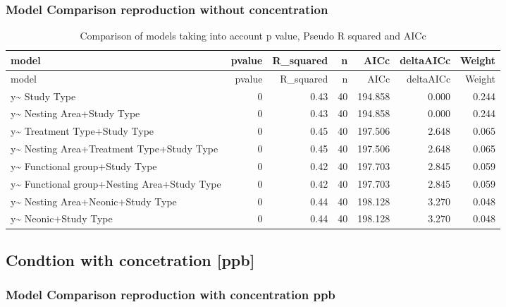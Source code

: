 \documentclass[]{elsarticle} %
\begin{document}
\subsubsection{Model Comparison reproduction without
concentration}\label{model-comparison-reproduction-without-concentration-1}

\begin{longtable}[c]{@{}lrrrrrr@{}}
\caption{Comparison of models taking into account p value, Pseudo R
squared and AICc}\tabularnewline
\toprule
model & pvalue & R\_squared & n & AICc & deltaAICc &
Weight\tabularnewline
\midrule
\endfirsthead
\toprule
model & pvalue & R\_squared & n & AICc & deltaAICc &
Weight\tabularnewline
\midrule
\endhead
y\textasciitilde{} Study Type & 0 & 0.43 & 40 & 194.858 & 0.000 &
0.244\tabularnewline
y\textasciitilde{} Nesting Area+Study Type & 0 & 0.43 & 40 & 194.858 &
0.000 & 0.244\tabularnewline
y\textasciitilde{} Treatment Type+Study Type & 0 & 0.45 & 40 & 197.506 &
2.648 & 0.065\tabularnewline
y\textasciitilde{} Nesting Area+Treatment Type+Study Type & 0 & 0.45 &
40 & 197.506 & 2.648 & 0.065\tabularnewline
y\textasciitilde{} Functional group+Study Type & 0 & 0.42 & 40 & 197.703
& 2.845 & 0.059\tabularnewline
y\textasciitilde{} Functional group+Nesting Area+Study Type & 0 & 0.42 &
40 & 197.703 & 2.845 & 0.059\tabularnewline
y\textasciitilde{} Nesting Area+Neonic+Study Type & 0 & 0.44 & 40 &
198.128 & 3.270 & 0.048\tabularnewline
y\textasciitilde{} Neonic+Study Type & 0 & 0.44 & 40 & 198.128 & 3.270 &
0.048\tabularnewline
\bottomrule
\end{longtable}

\subsection{Condtion with concetration
{[}ppb{]}}\label{condtion-with-concetration-ppb}

\subsubsection{Model Comparison reproduction with concentration
ppb}\label{model-comparison-reproduction-with-concentration-ppb-1}
\end{document}
